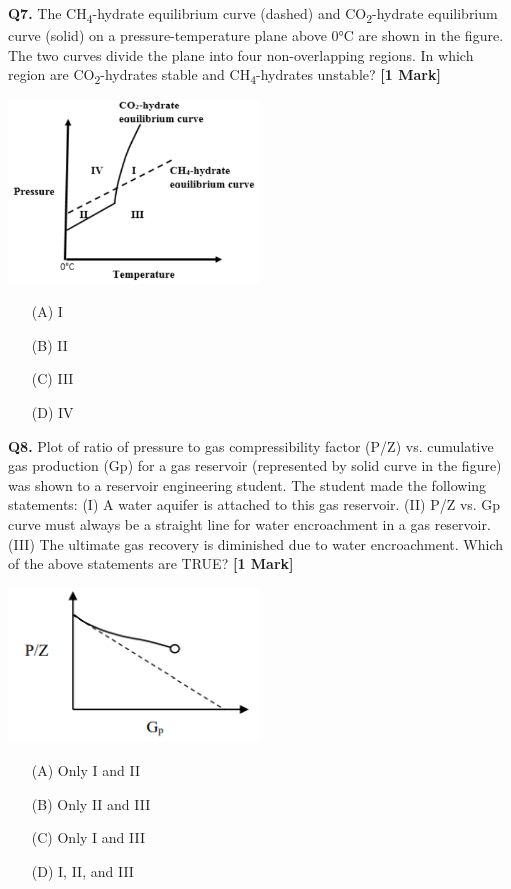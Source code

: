 \documentclass[11pt]{article}
\newcommand{\questiona}[2]{
    \noindent\textbf{Q#2.} #1 \hfill \textbf{[1 Mark]}
}
\begin{document}
\questiona{The CH\textsubscript{4}-hydrate equilibrium curve (dashed) and CO\textsubscript{2}-hydrate equilibrium curve (solid) on a pressure-temperature plane above 0°C are shown in the figure. The two curves divide the plane into four non-overlapping regions. In which region are CO\textsubscript{2}-hydrates stable and CH\textsubscript{4}-hydrates unstable?}{7}
\begin{center}
\includegraphics[width=0.5\textwidth]{figures/7.png}
\end{center}
\begin{enumerate}
    \item[(A)] I  
    \item[(B)] II  
    \item[(C)] III  
    \item[(D)] IV  
\end{enumerate}
\vspace{0.5cm}

\questiona{Plot of ratio of pressure to gas compressibility factor (P/Z) vs. cumulative gas production (Gp) for a gas reservoir (represented by solid curve in the figure) was shown to a reservoir engineering student. The student made the following statements: (I) A water aquifer is attached to this gas reservoir. (II) P/Z vs. Gp curve must always be a straight line for water encroachment in a gas reservoir. (III) The ultimate gas recovery is diminished due to water encroachment. Which of the above statements are TRUE?}{8}
\begin{center}
\includegraphics[width=0.5\textwidth]{figures/8.png}
\end{center}
\begin{enumerate}
    \item[(A)] Only I and II  
    \item[(B)] Only II and III  
    \item[(C)] Only I and III  
    \item[(D)] I, II, and III  
\end{enumerate}
\vspace{0.5cm}
\end{document}
